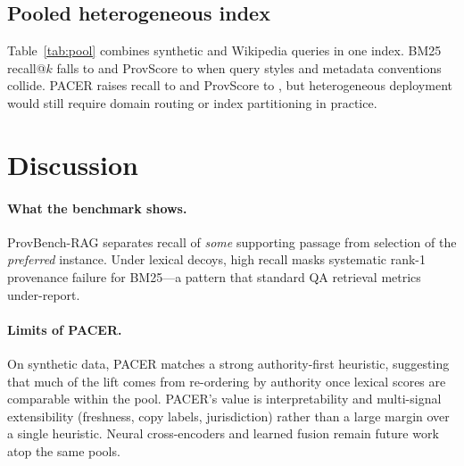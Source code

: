 \documentclass[sigconf,anonymous,review]{acmart}
\begin{document}
\begin{table}[t]
  \centering
  \caption{Wikipedia revision freshness track ($n{=}$\WikiNumQueries{}).}
  \label{tab:wikirev}
  \resizebox{\columnwidth}{!}{}
\end{table}

\subsection{Pooled heterogeneous index}
Table~\ref{tab:pool} combines synthetic and Wikipedia queries in one index.
BM25 recall@$k$ falls to \CombinedBmRecall{} and ProvScore to \CombinedBmProvScore{} when query styles and metadata conventions collide.
PACER raises recall to \CombinedPacerRecall{} and ProvScore to \CombinedPacerProvScore{}, but heterogeneous deployment would still require domain routing or index partitioning in practice.

\begin{table}[t]
  \centering
  \caption{Pooled synthetic + Wikipedia retrieval ($n{=}$\CombinedNumQueries{}).}
  \label{tab:pool}
  \resizebox{\columnwidth}{!}{}
\end{table}

\section{Discussion}
\label{sec:discussion}

\paragraph{What the benchmark shows.}
ProvBench-RAG separates recall of \emph{some} supporting passage from selection of the \emph{preferred} instance.
Under lexical decoys, high recall masks systematic rank-1 provenance failure for BM25---a pattern that standard QA retrieval metrics under-report.

\paragraph{Limits of PACER.}
On synthetic data, PACER matches a strong authority-first heuristic, suggesting that much of the lift comes from re-ordering by authority once lexical scores are comparable within the pool.
PACER's value is interpretability and multi-signal extensibility (freshness, copy labels, jurisdiction) rather than a large margin over a single heuristic.
Neural cross-encoders and learned fusion remain future work atop the same pools.
\end{document}
